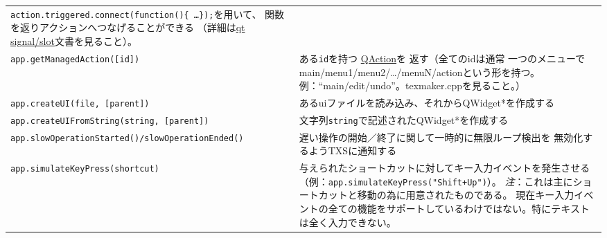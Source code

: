 \begin{table}[H]
\begin{tabularx}{\linewidth}{lX}
      \texttt{action.triggered.connect(function()\{ \ldots{}\});}を用いて、
      関数を返りアクションへつなげることができる
      （詳細は\href{http://developer.qt.nokia.com/doc/qt-4.8/scripting.html\#signal-to-function-connections}{qt signal/slot}文書を見ること）。\\
    \texttt{app.getManagedAction({[}id{]})}
      & ある\texttt{id}を持つ
      \href{http://developer.qt.nokia.com/doc/qt-4.8/QAction.html}{QAction}を
      返す（全てのidは通常
      一つのメニューでmain/menu1/menu2/\ldots{}/menuN/actionという形を持つ。
      例：``main/edit/undo''。texmaker.cppを見ること。）\\
    \texttt{app.createUI(file, {[}parent{]})}
      & あるuiファイルを読み込み、それからQWidget*を作成する\\
    \texttt{app.createUIFromString(string, {[}parent{]})}
      & 文字列\texttt{string}で記述されたQWidget*を作成する\\
    \texttt{app.slowOperationStarted()/slowOperationEnded()}
      & 遅い操作の開始／終了に関して一時的に無限ループ検出を
      無効化するようTXSに通知する\\
    \texttt{app.simulateKeyPress(shortcut)}
      & 与えられたショートカットに対してキー入力イベントを発生させる
      （例：\verb|app.simulateKeyPress("Shift+Up")|）。
      \emph{注}：これは主にショートカットと移動の為に用意されたものである。
      現在キー入力イベントの全ての機能をサポートしているわけではない。特にテキストは全く入力できない。\\
    \hline
  \end{tabularx}
\end{table}

